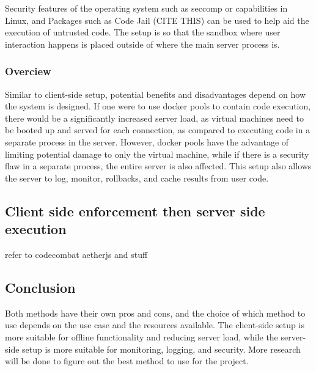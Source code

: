 Security features of the operating system such as seccomp or capabilities in Linux, and Packages such as Code Jail (CITE THIS) can be used to help aid the execution of untrusted code. The setup is so that the sandbox where user interaction happens is placed outside of where the main server process is.



\subsubsection{Overciew}
Similar to client-side setup, potential benefits and disadvantages depend on how the system is designed. If one were to use docker pools to contain code execution, there would be a significantly increased server load, as virtual machines need to be booted up and served for each connection, as compared to executing code in a separate process in the server. However, docker pools have the advantage of limiting potential damage to only the virtual machine, while if there is a security flaw in a separate process, the entire server is also affected. This setup also allows the server to log, monitor, rollbacks, and cache results from user code.









\subsection{Client side enforcement then server side execution}
refer to codecombat aetherjs and stuff


\subsection{Conclusion}
Both methods have their own pros and cons, and the choice of which method to use depends on the use case and the resources available. The client-side setup is more suitable for offline functionality and reducing server load, while the server-side setup is more suitable for monitoring, logging, and security. More research will be done to figure out the best method to use for the project.
